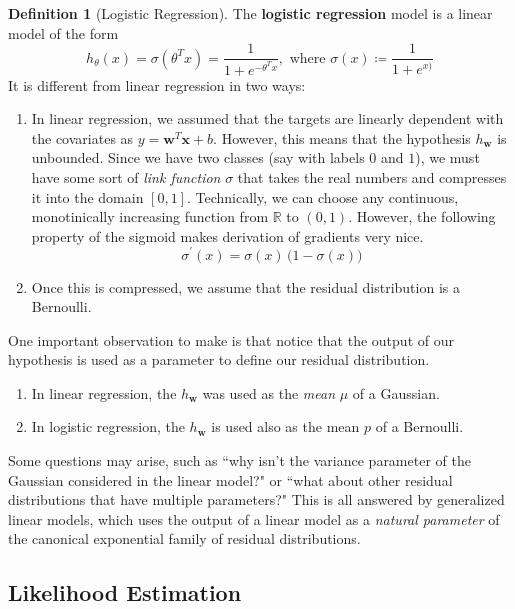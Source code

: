 \documentclass{article}
\theoremstyle{definition}
\newtheorem{definition}{Definition}[section]
\begin{document}
  \begin{definition}[Logistic Regression]
  The \textbf{logistic regression} model is a linear model of the form 
  \[h_\theta (x) = \sigma (\theta^T x) = \frac{1}{1 + e^{- \theta^T x}}, \text{ where } \sigma(x) \coloneqq \frac{1}{1 + e^{x)}}\]
  It is different from linear regression in two ways: 
  \begin{enumerate}
      \item In linear regression, we assumed that the targets are linearly dependent with the covariates as $y = \mathbf{w}^T \mathbf{x} + b$. However, this means that the hypothesis $h_\mathbf{w}$ is unbounded. Since we have two classes (say with labels $0$ and $1$), we must have some sort of \textit{link function} $\sigma$ that takes the real numbers and compresses it into the domain $[0, 1]$. Technically, we can choose any continuous, monotinically increasing function from $\mathbb{R}$ to $(0, 1)$. However, the following property of the sigmoid makes derivation of gradients very nice. 
      \[\sigma^\prime (x) = \sigma(x) \, \big(1 - \sigma(x) \big)\]

      \item Once this is compressed, we assume that the residual distribution is a Bernoulli. 
  \end{enumerate}
  \end{definition}

  One important observation to make is that notice that the output of our hypothesis is used as a parameter to define our residual distribution. 
  \begin{enumerate}
      \item In linear regression, the $h_\mathbf{w}$ was used as the \textit{mean} $\mu$ of a Gaussian. 
      \item In logistic regression, the $h_\mathbf{w}$ is used also as the mean $p$ of a Bernoulli. 
  \end{enumerate}
  Some questions may arise, such as ``why isn't the variance parameter of the Gaussian considered in the linear model?" or ``what about other residual distributions that have multiple parameters?" This is all answered by generalized linear models, which uses the output of a linear model as a \textit{natural parameter} of the canonical exponential family of residual distributions. 

  \subsection{Likelihood Estimation}
\end{document}
